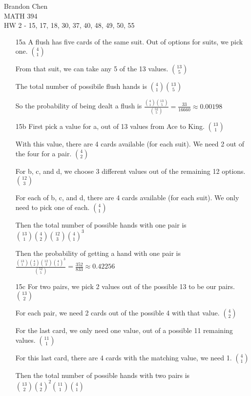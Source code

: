 \documentclass[11pt]{article}
\begin{document}
\noindent Brandon Chen \\
MATH 394 \\
HW 2 - 15, 17, 18, 30, 37, 40, 48, 49, 50, 55

\begin{itemize}
\item[15a]
  A flush has five cards of the same suit. Out of options for suits, we pick one.
  $\binom{4}{1}$

  From that suit, we can take any 5 of the 13 values.
  $\binom{13}{5}$

  The total number of possibile flush hands is
  $\binom{4}{1} \binom{13}{5}$

  So the probability of being dealt a flush is
  $\frac{\binom{4}{1} \binom{13}{5}}{\binom{52}{5}}
  = \frac{33}{16660} \approx 0.00198$

\item[15b]
  First pick a value for a, out of 13 values from Ace to King.
  $\binom{13}{1}$

  With this value, there are 4 cards available (for each suit).
  We need 2 out of the four for a pair.
  $\binom{4}{2}$

  For b, c, and d, we choose 3 different values out of the remaining 12 options.
  $\binom{12}{3}$

  For each of b, c, and d, there are 4 cards available (for each suit).
  We only need to pick one of each.
  $\binom{4}{1}$

  Then the total number of possible hands with one pair is
  $\binom{13}{1}\binom{4}{2}\binom{12}{3}{\binom{4}{1}^3}$

  Then the probability of getting a hand with one pair is
  $\frac{\binom{13}{1}\binom{4}{2}\binom{12}{3}{\binom{4}{1}}^3}{\binom{52}{5}} = \frac{352}{833} \approx 0.42256$

\item[15c]
  For two pairs, we pick 2 values out of the possible 13 to be our pairs.
  $\binom{13}{2}$

  For each pair, we need 2 cards out of the possible 4 with that value. $\binom{4}{2}$

  For the last card, we only need one value, out of a possible 11 remaining values. $\binom{11}{1}$

  For this last card, there are 4 cards with the matching value, we need 1. $\binom{4}{1}$

  Then the total number of possible hands with two pairs is $\binom{13}{2}{\binom{4}{2}}^2 \binom{11}{1}\binom{4}{1}$


\end{itemize}
\end{document}
